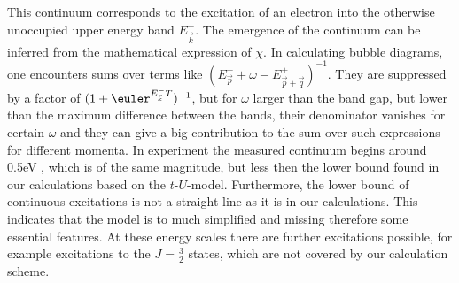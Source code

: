 This continuum corresponds to the excitation of an electron into the otherwise unoccupied upper energy band $E^+_{\vec k}$.
The emergence of the continuum can be inferred from the  mathematical expression of $\chi$. 
In calculating bubble diagrams, one encounters sums over terms like $(E^{-}_{\vec p} +\omega - E^+_{\vec p + \vec q})^{-1}$.
They are suppressed by a factor of $(1+\euler^{E^-_{\vec k} T})^{-1}$, but
for $\omega$ larger than the band gap, but lower than the maximum difference between the bands, their denominator vanishes for certain $\omega$ 
and they can give a big contribution to the sum over such expressions for different momenta. 
In experiment the measured continuum begins around 0.5eV \cite{PhysRevLett.86.5377}, which is of the same magnitude, but less then the lower bound found in our calculations based
on the $t$-$U$-model.
Furthermore, the lower bound of continuous excitations is not a straight line as it is in our calculations. 
This indicates that the model is to much simplified and missing therefore some essential features.
At these energy scales there are further excitations possible, for example excitations to the $J=\frac32$ states, which are not covered by our calculation scheme.












 

%
%





